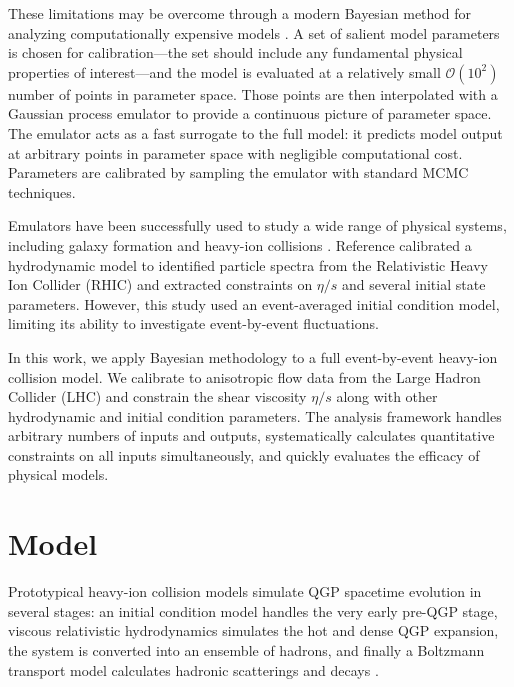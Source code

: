 \documentclass[aps,prc,reprint,superscriptaddress,amsmath]{revtex4-1}
\begin{document}
These limitations may be overcome through a modern Bayesian method for analyzing computationally expensive models \cite{OHagan:2006ba,Higdon:2008cmc,Higdon:2014tva}.
A set of salient model parameters is chosen for calibration---the set should include any fundamental physical properties of interest---and the model is evaluated at a relatively small $\mathcal O(10^2)$ number of points in parameter space.
Those points are then interpolated with a Gaussian process emulator \cite{Rasmussen:2006gp} to provide a continuous picture of parameter space.
The emulator acts as a fast surrogate to the full model:
it predicts model output at arbitrary points in parameter space with negligible computational cost.
Parameters are calibrated by sampling the emulator with standard MCMC techniques.

Emulators have been successfully used to study a wide range of physical systems, including galaxy formation \cite{Gomez:2012ak} and heavy-ion collisions \cite{Novak:2013bqa}.
Reference \cite{Novak:2013bqa} calibrated a hydrodynamic model to identified particle spectra from the Relativistic Heavy Ion Collider (RHIC) and extracted constraints on $\eta/s$ and several initial state parameters.
However, this study used an event-averaged initial condition model, limiting its ability to investigate event-by-event fluctuations.

In this work, we apply Bayesian methodology to a full event-by-event heavy-ion collision model.
We calibrate to anisotropic flow data from the Large Hadron Collider (LHC) and constrain the shear viscosity $\eta/s$ along with other hydrodynamic and initial condition parameters.
The analysis framework handles arbitrary numbers of inputs and outputs, systematically calculates quantitative constraints on all inputs simultaneously, and quickly evaluates the efficacy of physical models.


\section{Model}

Prototypical heavy-ion collision models simulate QGP spacetime evolution in several stages:
an initial condition model handles the very early pre-QGP stage, viscous relativistic hydrodynamics simulates the hot and dense QGP expansion, the system is converted into an ensemble of hadrons, and finally a Boltzmann transport model calculates hadronic scatterings and decays \cite{Bass:2000ib,Nonaka:2006yn,Song:2010mg}.
\end{document}
